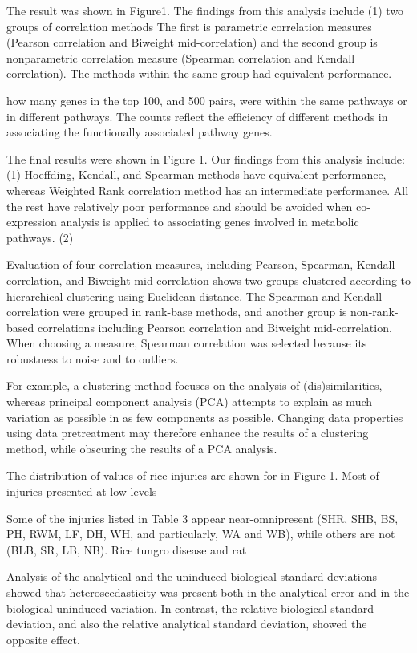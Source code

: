 The result was shown in Figure1. The findings from this analysis include (1) two groups of correlation methods
The first is parametric correlation measures (Pearson correlation and Biweight mid-correlation) and the second group is nonparametric correlation measure (Spearman correlation and Kendall correlation). The methods within the same group had equivalent performance.

 how many genes in the top 100, and 500 pairs, were within the same pathways or in different pathways. The counts reflect the efficiency of different methods in associating the functionally associated pathway genes. 

The final results were shown in Figure 1. Our findings from this analysis include: (1) Hoeffding, Kendall, and Spearman methods have equivalent performance, whereas Weighted Rank correlation method has an intermediate performance. All the rest have relatively poor performance and should be avoided when co-expression analysis is applied to associating genes involved in metabolic pathways. (2)

Evaluation of four correlation measures, including Pearson, Spearman, Kendall correlation, and Biweight mid-correlation shows two groups clustered according to hierarchical clustering using Euclidean distance. The Spearman and Kendall correlation were grouped in rank-base methods, and another group is non-rank-based correlations including Pearson correlation and Biweight mid-correlation. When choosing a measure, Spearman correlation was selected because its robustness to noise and to outliers.

For example, a clustering method focuses on the analysis of (dis)similarities, whereas principal component analysis (PCA) attempts to explain as much variation as possible in as few components as possible. Changing data properties using data pretreatment may therefore enhance the results of a clustering method, while obscuring the results of a PCA analysis.

The distribution of values of rice injuries are shown for in Figure 1. Most of injuries presented at low levels

Some of the injuries listed in Table 3 appear near-omnipresent (SHR, SHB, BS, PH, RWM, LF, DH, WH, and particularly, WA and WB), while others are not (BLB, SR, LB, NB). Rice tungro disease and rat

Analysis of the analytical and the uninduced biological standard deviations showed that heteroscedasticity was present both in the analytical error and in the biological uninduced variation. In contrast, the relative biological standard deviation, and also the relative analytical standard deviation, showed the opposite effect.

